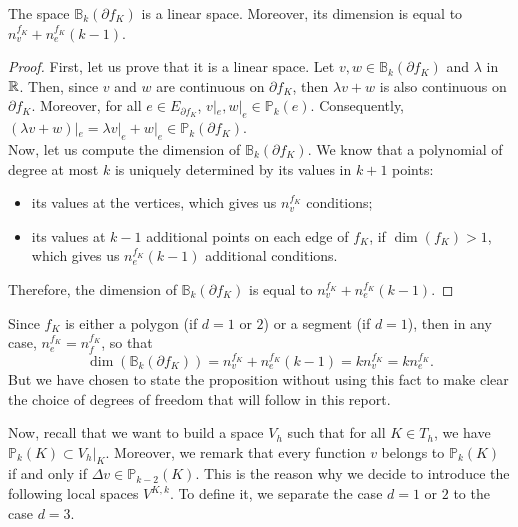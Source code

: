 \begin{proposition} \label{dimBk}
The space $\mathbb{B}_k(\partial f_K)$ is a linear space. Moreover, its dimension is equal to $n_v^{f_K}+n_e^{f_K}(k-1)$.
\end{proposition}

\begin{proof}
First, let us prove that it is a linear space. Let $v,w\in \mathbb{B}_k(\partial f_K)$ and $\lambda$ in $\mathbb{R}$. Then, since $v$ and $w$ are continuous on $\partial f_K$, then $\lambda v+w$ is also continuous on $\partial f_K$. Moreover, for all $e\in E_{\partial f_K}$, $v|_e, w|_e\in \mathbb{P}_k(e)$. Consequently, $\left(\lambda v + w\right)|_e = \lambda v|_e + w|_e \in \mathbb{P}_k(\partial f_K)$. \\
Now, let us compute the dimension of $\mathbb{B}_k(\partial f_K)$. We know that a polynomial of degree at most $k$ is uniquely determined by its values in $k+1$ points: 
\begin{itemize}
\item its values at the vertices, which gives us $n_v^{f_K}$ conditions;
\item its values at $k-1$ additional points on each edge of $f_K$, if $\dim(f_K)>1$, which gives us $n_e^{f_K}(k-1)$ additional conditions.
\end{itemize}
Therefore, the dimension of $\mathbb{B}_k(\partial f_K)$ is equal to $n_v^{f_K}+n_e^{f_K}(k-1)$. 
\end{proof}

\begin{remark}
Since $f_K$ is either a polygon (if $d=1$ or $2$) or a segment (if $d=1$), then in any case, $n_e^{f_K} = n_f^{f_K}$, so that $$\dim\left(\mathbb{B}_k\left(\partial f_K\right)\right) = n_v^{f_K}+n_e^{f_K}(k-1) = kn_v^{f_K} = kn_e^{f_K}.$$ 
But we have chosen to state the proposition without using this fact to make clear the choice of degrees of freedom that will follow in this report.
\end{remark}

Now, recall that we want to build a space $V_h$ such that for all $K\in T_h$, we have $\mathbb{P}_k(K) \subset V_h|_K$. Moreover, we remark that every function $v$ belongs to $\mathbb{P}_k(K)$ if and only if $\Delta v\in \mathbb{P}_{k-2}(K)$. This is the reason why we decide to introduce the following local spaces $V^{K,k}$. To define it, we separate the case $d=1$ or $2$ to the case $d=3$. \newline 

